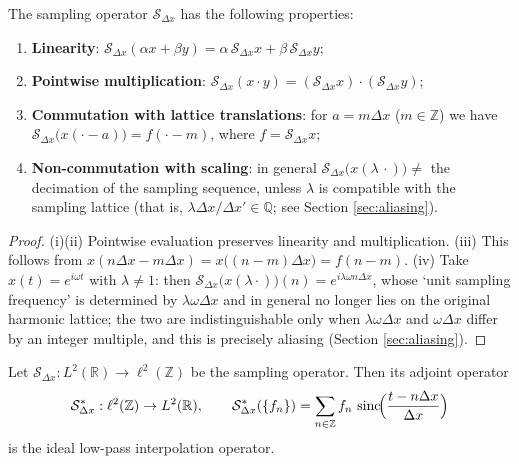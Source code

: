 \begin{proposition}\label{prop:sampling_algebra_parallel}
The sampling operator $\mathcal{S}_{\Delta x}$ has the following properties:
\begin{enumerate}[label=(\roman*)]
    \item \textbf{Linearity}: $\mathcal{S}_{\Delta x}(\alpha x+\beta y)=\alpha\,\mathcal{S}_{\Delta x}x+\beta\,\mathcal{S}_{\Delta x}y$;
    \item \textbf{Pointwise multiplication}: $\mathcal{S}_{\Delta x}(x\cdot y)=(\mathcal{S}_{\Delta x}x)\cdot(\mathcal{S}_{\Delta x}y)$;
    \item \textbf{Commutation with lattice translations}: for $a=m\Delta x$ ($m\in\mathbb{Z}$) we have $\mathcal{S}_{\Delta x}\big(x(\cdot-a)\big)=f(\cdot-m)$, where $f=\mathcal{S}_{\Delta x}x$;
    \item \textbf{Non-commutation with scaling}: in general $\mathcal{S}_{\Delta x}\big(x(\lambda\,\cdot)\big)\neq$ the decimation of the sampling sequence, unless $\lambda$ is compatible with the sampling lattice (that is, $\lambda\Delta x/\Delta x'\in\mathbb{Q}$; see Section \ref{sec:aliasing}).
\end{enumerate}
\end{proposition}

\begin{proof}
(i)(ii) Pointwise evaluation preserves linearity and multiplication. (iii) This follows from $x(n\Delta x-m\Delta x)=x\big((n-m)\Delta x\big)=f(n-m)$. (iv) Take $x(t)=e^{i\omega t}$ with $\lambda\ne1$: then $\mathcal{S}_{\Delta x}\big(x(\lambda\cdot)\big)(n)=e^{i\lambda\omega n\Delta x}$, whose `unit sampling frequency' is determined by $\lambda\omega\Delta x$ and in general no longer lies on the original harmonic lattice; the two are indistinguishable only when $\lambda\omega\Delta x$ and $\omega\Delta x$ differ by an integer multiple, and this is precisely aliasing (Section \ref{sec:aliasing}).
\end{proof}

\begin{property}\label{prop:sampling_adjoint}
Let $\mathcal{S}_{\Delta x}:L^2(\mathbb{R})\to\ell^2(\mathbb{Z})$ be the sampling operator. Then its adjoint operator
\[
\mathcal{S}_{\Delta x}^*:\ell^2(\mathbb{Z})\to L^2(\mathbb{R}),
\qquad
\mathcal{S}_{\Delta x}^*(\{f_n\}) = \sum_{n\in\mathbb{Z}}f_n\,\operatorname{sinc}\!\Bigl(\frac{t-n\Delta x}{\Delta x}\Bigr)
\]
is the ideal low-pass interpolation operator.
\end{property}

